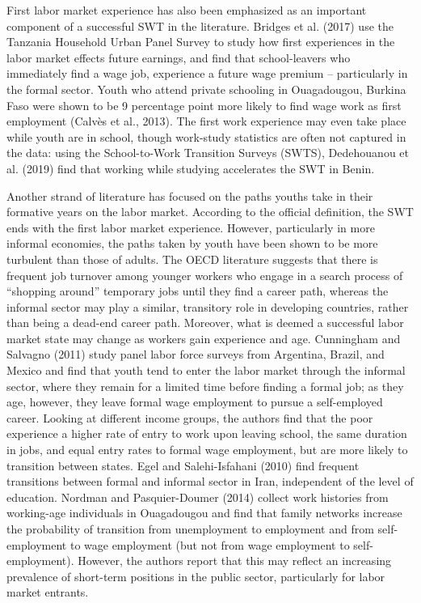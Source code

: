 \documentclass[
  11pt,
a4paper
]{article}
\begin{document}
First labor market experience has also been emphasized as an important component of a successful SWT in the literature. Bridges et al. (2017) use the Tanzania Household Urban Panel Survey to study how first experiences in the labor market effects future earnings, and find that school-leavers who immediately find a wage job, experience a future wage premium -- particularly in the formal sector. Youth who attend private schooling in Ouagadougou, Burkina Faso were shown to be 9 percentage point more likely to find wage work as first employment (Calvès et al., 2013). The first work experience may even take place while youth are in school, though work-study statistics are often not captured in the data: using the School-to-Work Transition Surveys (SWTS), Dedehouanou et al. (2019) find that working while studying accelerates the SWT in Benin.

Another strand of literature has focused on the paths youths take in their formative years on the labor market. According to the official definition, the SWT ends with the first labor market experience. However, particularly in more informal economies, the paths taken by youth have been shown to be more turbulent than those of adults. The OECD literature suggests that there is frequent job turnover among younger workers who engage in a search process of ``shopping around'' temporary jobs until they find a career path, whereas the informal sector may play a similar, transitory role in developing countries, rather than being a dead-end career path. Moreover, what is deemed a successful labor market state may change as workers gain experience and age. Cunningham and Salvagno (2011) study panel labor force surveys from Argentina, Brazil, and Mexico and find that youth tend to enter the labor market through the informal sector, where they remain for a limited time before finding a formal job; as they age, however, they leave formal wage employment to pursue a self-employed career. Looking at different income groups, the authors find that the poor experience a higher rate of entry to work upon leaving school, the same duration in jobs, and equal entry rates to formal wage employment, but are more likely to transition between states. Egel and Salehi-Isfahani (2010) find frequent transitions between formal and informal sector in Iran, independent of the level of education. Nordman and Pasquier-Doumer (2014) collect work histories from working-age individuals in Ouagadougou and find that family networks increase the probability of transition from unemployment to employment and from self-employment to wage employment (but not from wage employment to self-employment). However, the authors report that this may reflect an increasing prevalence of short-term positions in the public sector, particularly for labor market entrants.
\end{document}

